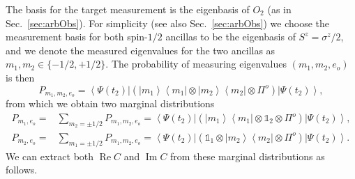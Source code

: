\documentclass[epjST,numbook]{svjour}
\newcommand{\ket}[1]{\left \vert #1 \right >}
\newcommand{\bra}[1]{\left < #1 \right \vert}
\newcommand{\matel}[3]{ \displaystyle \left\langle #1 \right \vert #2 \left\vert  #3 \right\rangle }
\DeclareMathOperator{\imp }{\mathrm{Im}}
\DeclareMathOperator{\rep}{\mathrm{Re}}
\begin{document}
The basis for the target measurement is the eigenbasis of $O_2$ (as in Sec.~\ref{sec:arbObs}). For simplicity (see also Sec.~\ref{sec:arbObs}) we choose the measurement basis for both spin-$1/2$ ancillas to be the eigenbasis of $S^z=\sigma^z/2$, and we denote the measured eigenvalues for the two ancillas as $m_1,m_2\in\{-1/2,+1/2\}$. The probability of measuring eigenvalues $(m_1,m_2,e_o)$ is then
\begin{equation}\label{e:simProbJoint}
		P_{m_1,m_2,e_o} = \matel{\Psi(t_2)}{(\ket{m_1}\!\bra{m_1}\otimes\ket{m_2}\!\bra{m_2}\otimes\Pi^o)}{\Psi(t_2)},
	\end{equation}
from which we obtain two marginal distributions
\begin{equation}\label{e:marg}
	\begin{split}
			P_{m_1,e_o} =& \sum_{m_2=\pm 1/2} P_{m_1,m_2,e_o} = \matel{\Psi(t_2)}{(\ket{m_1}\!\bra{m_1}\otimes\mathds{1}_2\otimes\Pi^o)}{\Psi(t_2)}, \\
			P_{m_2,e_o} =& \sum_{m_1=\pm1/2} P_{m_1,m_2,e_o} = \matel{\Psi(t_2)}{(\mathds{1}_1\otimes\ket{m_2}\!\bra{m_2}\otimes\Pi^o)}{\Psi(t_2)}.
	\end{split}
\end{equation}
We can extract both $\rep C$ and $\imp C$ from these marginal distributions as follows.
\end{document}
